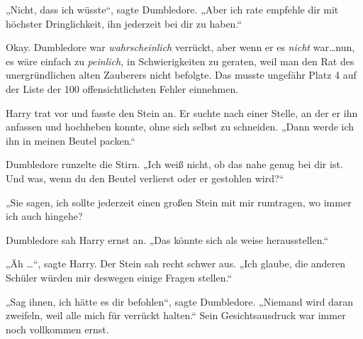 „Nicht, dass ich wüsste“, sagte Dumbledore. „Aber ich rate empfehle dir mit höchster Dringlichkeit, ihn jederzeit bei dir zu haben.“

Okay. Dumbledore war \emph{wahrscheinlich} verrückt, aber wenn er es \emph{nicht} war…nun, es wäre einfach zu \emph{peinlich,} in Schwierigkeiten zu geraten, weil man den Rat des unergründlichen alten Zauberers nicht befolgte. Das musste ungefähr Platz 4 auf der Liste der 100 offensichtlichsten Fehler einnehmen.

Harry trat vor und fasste den Stein an. Er suchte nach einer Stelle, an der er ihn anfassen und hochheben konnte, ohne sich selbst zu schneiden. „Dann werde ich ihn in meinen Beutel packen.“

Dumbledore runzelte die Stirn. „Ich weiß nicht, ob das nahe genug bei dir ist. Und was, wenn du den Beutel verlierst oder er gestohlen wird?“

„Sie sagen, ich sollte jederzeit einen großen Stein mit mir rumtragen, wo immer ich auch hingehe?

Dumbledore sah Harry ernst an. „Das könnte sich als weise herausstellen.“

„Äh …“, sagte Harry. Der Stein sah recht schwer aus. „Ich glaube, die anderen Schüler würden mir deswegen einige Fragen stellen.“

„Sag ihnen, ich hätte es dir befohlen“, sagte Dumbledore. „Niemand wird daran zweifeln, weil alle mich für verrückt halten.“ Sein Gesichtsausdruck war immer noch vollkommen ernst.

